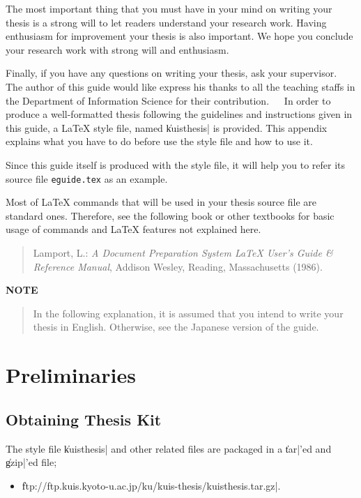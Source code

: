 The most important thing that you must have in your mind on writing your
thesis is a strong will to let readers understand your research work.
Having enthusiasm for improvement your thesis is also important.  We hope
you conclude your research work with strong will and enthusiasm.

Finally, if you have any questions on writing your thesis, ask your
supervisor.

\acknowledgments				%
The author of this guide would like express his thanks to all the teaching
staffs in the Department of Information Science for their
contribution.

\nocite{*}

In order to produce a well-formatted thesis following the guidelines and
instructions given in this guide, a \LaTeX{} style file, named \|kuisthesis|
is provided.  This appendix explains what you have to do before use the style
file and how to use it.

Since this guide itself is produced with the style file, it will help you to
refer its source file \verb|eguide.tex| as an example.

Most of \LaTeX{} commands that will be used in your thesis source file are
standard ones.  Therefore, see the following book or other textbooks for
basic usage of commands and \LaTeX{} features not explained here.
\begin{quote}%
Lamport, L.: {\em A Document Preparation System {\LaTeX} User's Guide \&
Reference Manual\/}, Addison Wesley, Reading, Massachusetts (1986).
\end{quote}%

\par\bigskip\centerline{\bf NOTE}
\begin{quote}
In the following explanation, it is assumed that you intend to write your
thesis in English.  Otherwise, see the Japanese version of the guide.
\end{quote}

\section{Preliminaries}\label{app-prelim}
\subsection{Obtaining Thesis Kit}\label{appsub-kit}
The style file \|kuisthesis| and other related files are packaged in a
\|tar|'ed and \|gzip|'ed file;
\begin{itemize}\item[]\small%
\|ftp://ftp.kuis.kyoto-u.ac.jp/ku/kuis-thesis/kuisthesis.tar.gz|\quad.
\end{itemize}%

